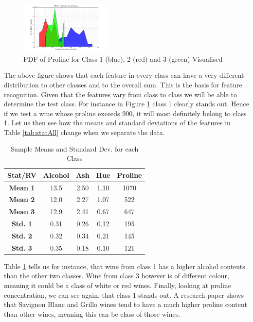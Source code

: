 \documentclass[10pt,twocolumn,letterpaper]{article}
\begin{document}
\begin{figure}[H]
\centering
\includegraphics[width=0.4\textwidth]{../results/Q1_ProlineDist_Idv}
\caption{PDF of Proline for Class 1 (blue), 2 (red) and 3 (green) Visualised \label{fig:DistProline_Idv}}
\end{figure}

The above figure shows that each feature in every class can have a very different distribution to other classes and to the overall sum. This is the basis for feature recognition. Given that the features vary from class to class we will be able to determine the test class. For instance in Figure \ref{fig:DistProline_Idv} class 1 clearly stands out. Hence if we test a wine whose proline exceeds 900, it will most definitely belong to class 1. Let us then see how the means and standard deviations of the features in Table \ref{tab:statAll} change when we separate the data.

\begin{table}
\caption{Sample Means and Standard Dev. for each Class \label{tab:statCla}}
\small
\begin{center}
\begin{tabular}{|c| c c c c|}
\hline
\bf Stat/RV & Alcohol & Ash & Hue & Proline \\ [0.5ex]
\hline
\bf Mean 1 & 13.5 & 2.50 & 1.10 & 1070 \\ [0.5ex]
\hline
\bf Mean 2 & 12.0 & 2.27 & 1.07 & 522 \\ [0.5ex]
\hline
\bf Mean 3 & 12.9 & 2.41 & 0.67 & 647 \\ [0.5ex]
\hline
\bf Std. 1 & 0.31 & 0.26 & 0.12 & 195 \\ [0.5ex]
\hline
\bf Std. 2 & 0.32 & 0.34 & 0.21 & 145 \\ [0.5ex]
\hline
\bf Std. 3 & 0.35 & 0.18 & 0.10 & 121 \\ [0.5ex]
\hline
\end{tabular}
\end{center}
\vspace{-5mm}
\end{table}

Table \ref{tab:statCla} tells us for instance, that wine from class 1 has a higher alcohol contents than the other two classes. Wine from class 3 however is of different colour, meaning it could be a class of white or red wines. Finally, looking at proline concentration, we can see again, that class 1 stands out. A research paper \cite{wine} shows that Savignon Blanc and Grillo wines tend to have a much higher proline content than other wines, meaning this can be class of those wines.
\end{document}
